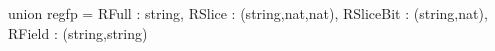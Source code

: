 union regfp = {
   RFull : string,
   RSlice : (string,nat,nat),
   RSliceBit : (string,nat),
   RField : (string,string)
}
